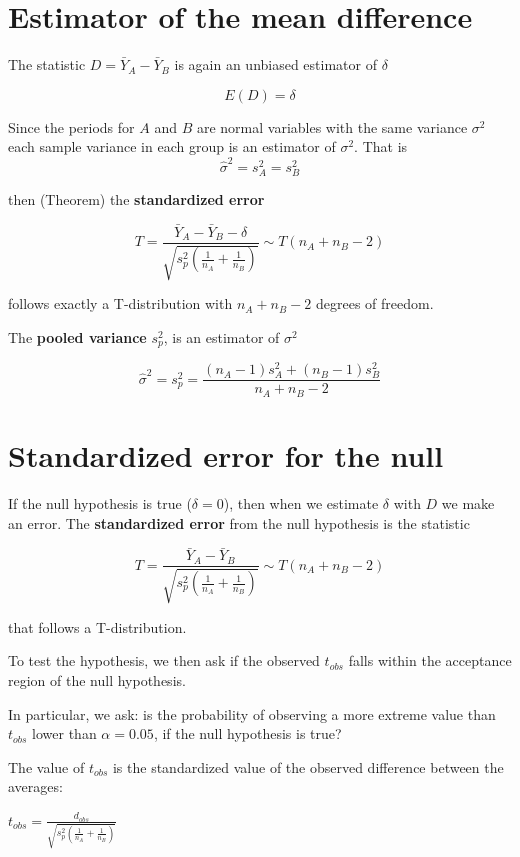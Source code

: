 \documentclass[
]{book}
\begin{document}
\hypertarget{estimator-of-the-mean-difference}{%
\section{Estimator of the mean difference}\label{estimator-of-the-mean-difference}}

The statistic \(D=\bar{Y}_A-\bar{Y}_B\) is again an unbiased estimator of \(\delta\)

\[E(D)=\delta\]

Since the periods for \(A\) and \(B\) are normal variables with the same variance \(\sigma^2\) each sample variance in each group is an estimator of \(\sigma^2\). That is \[\hat{\sigma}^2=s^2_A=s^2_B\]

then (Theorem) the \textbf{standardized error}

\[T=\frac{\bar{Y}_A-\bar{Y}_B -\delta}{\sqrt{s_p^2(\frac{1}{n_A}+\frac{1}{n_B})}} \sim T(n_A+n_B-2)\]

follows exactly a T-distribution with \(n_A+n_B-2\) degrees of freedom.

The \textbf{pooled variance} \(s_p^2\), is an estimator of \(\sigma^2\)

\[\hat{\sigma}^2=s_p^2= \frac{(n_A-1) s^2_A+(n_B-1) s^2_B}{n_A+n_B-2}\]

\hypertarget{standardized-error-for-the-null-1}{%
\section{Standardized error for the null}\label{standardized-error-for-the-null-1}}

If the null hypothesis is true (\(\delta=0\)), then when we estimate \(\delta\) with \(D\) we make an error. The \textbf{standardized error} from the null hypothesis is the statistic

\[T=\frac{\bar{Y}_A-\bar{Y}_B }{\sqrt{s_p^2(\frac{1}{n_A}+\frac{1}{n_B})}} \sim T(n_A+n_B-2)\]

that follows a T-distribution.

To test the hypothesis, we then ask if the observed \(t_{obs}\) falls within the acceptance region of the null hypothesis.

In particular, we ask: is the probability of observing a more extreme value than \(t_{obs}\) lower than \(\alpha=0.05\), if the null hypothesis is true?

The value of \(t_{obs}\) is the standardized value of the observed difference between the averages:

\(t_{obs}=\frac{d_{obs}}{\sqrt{s_p^2(\frac{1}{n_A}+\frac{1}{n_B})}}\)
\end{document}
